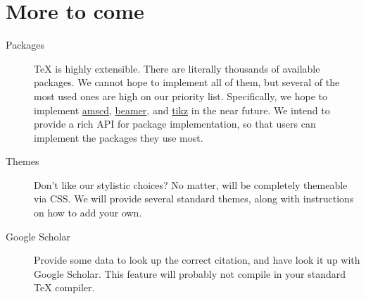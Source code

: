 \documentclass[11pt]{article}
\begin{document}
\section{More to come}
\begin{description}
    \item[Packages]
        \TeX{} is highly extensible.
        There are literally thousands of available packages.
        We cannot hope to implement all of them, but several of the most used ones are high on our priority list.
        Specifically, we hope to implement \href{https://www.ctan.org/pkg/amscd}{amscd}, \href{https://www.ctan.org/pkg/beamer}{beamer}, and \href{http://www.texample.net/tikz/}{tikz} in the near future.
        We intend to provide a rich API for package implementation, so that users can implement the packages they use most.

    \item[Themes]
        Don't like our stylistic choices?
        No matter, \DiscoTeX{} will be completely themeable via CSS.
        We will provide several standard themes, along with instructions on how to add your own.

    \item[Google Scholar] Provide some data to look up the correct citation, and have \DiscoTeX{} look it up with Google Scholar. This feature will probably not compile in your standard \TeX{} compiler.
\end{description}

\begin{thebibliography}{widest-label}
\end{thebibliography}
\end{document}
